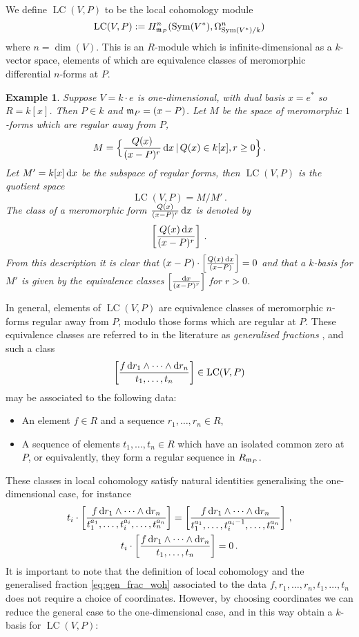 \documentclass[english,letter paper,12pt,reqno]{article}
\theoremstyle{example}
\newtheorem{example}[theorem]{Example}
\numberwithin{equation}{section}
\DeclareMathOperator{\Sym}{Sym}
\DeclareMathOperator{\LC}{LC}
\begin{document}
We define $\LC(V,P)$ to be the local cohomology module
\[
\LC(V,P) := H^n_{\mf{m}_P}(\Sym(V^*), \Omega^n_{\Sym(V^*)/k})
\]
where $n = \dim(V)$. This is an $R$-module which is infinite-dimensional as a $k$-vector space, elements of which are equivalence classes of meromorphic differential $n$-forms at $P$.

\begin{example} Suppose $V = k \cdot e$ is one-dimensional, with dual basis $x = e^*$ so $R = k[x]$. Then $P \in k$ and $\mathfrak{m}_P = (x-P)$. Let $M$ be the space of meromorphic $1$-forms which are regular away from $P$,
\[
M = \Big\{ \frac{Q(x)}{(x-P)^r} \operatorname{d}\!{x} \,|\, Q(x) \in k[x], r \ge 0 \Big\}\,.
\]
Let $M' = k[x] \operatorname{d}\!{x}$ be the subspace of regular forms, then $\LC(V,P)$ is the quotient space
\[
\LC( V, P ) = M / M'\,.
\]
The class of a meromorphic form $\frac{Q(x)}{(x-P)^r} \operatorname{d}\!{x}$ is denoted by
\begin{equation}\label{eq:gen_frac_1d}
\left[ \frac{Q(x) \operatorname{d}\!{x}}{(x-P)^r} \right]\,.
\end{equation}
From this description it is clear that $(x-P) \cdot \left[ \frac{Q(x) \operatorname{d}\!{x}}{(x-P)} \right] = 0$ and that a $k$-basis for $M'$ is given by the equivalence classes $\left[ \frac{\operatorname{d}\!{x}}{(x-P)^r} \right]$ for $r > 0$.
\end{example}

In general, elements of $\LC(V,P)$ are equivalence classes of meromorphic $n$-forms regular away from $P$, modulo those forms which are regular at $P$. These equivalence classes are referred to in the literature as \emph{generalised fractions} \cite{Lipman84,Kunz08}, and such a class
\begin{equation}\label{eq:gen_frac_woh}
\left[ \frac{f \ud{r_1} \wedge \cdots \wedge \ud{r_n}}{t_1, \ldots, t_n} \right] \in \LC(V,P)
\end{equation}
may be associated to the following data:
\begin{itemize}
\item An element $f \in R$ and a sequence $r_1,\ldots,r_n \in R$,
\item A sequence of elements $t_1,\ldots,t_n \in R$ which have an isolated common zero at $P$, or equivalently, they form a regular sequence in $R_{\mathfrak{m}_P}$.
\end{itemize}
These classes in local cohomology satisfy natural identities generalising the one-dimensional case, for instance
\begin{gather*}
t_i \cdot \left[ \frac{f \operatorname{d}\!{r_1} \wedge \cdots \wedge \operatorname{d}\!{r_n}}{t_1^{a_1}, \ldots, t_i^{a_i}, \ldots, t_n^{a_n}} \right] = \left[ \frac{f \operatorname{d}\!{r_1} \wedge \cdots \wedge \operatorname{d}\!{r_n}}{t_1^{a_1}, \ldots, t_i^{a_i-1}, \ldots, t_n^{a_n}} \right]\,,\\
t_i \cdot \left[ \frac{f \operatorname{d}\!{r_1} \wedge \cdots \wedge \operatorname{d}\!{r_n}}{t_1, \ldots, t_n} \right] = 0\,.
\end{gather*}
It is important to note that the definition of local cohomology and the generalised fraction \eqref{eq:gen_frac_woh} associated to the data $f,r_1,\ldots,r_n,t_1,\ldots,t_n$ does not require a choice of coordinates. However, by choosing coordinates we can reduce the general case to the one-dimensional case, and in this way obtain a $k$-basis for $\LC(V,P)$:
\end{document}
